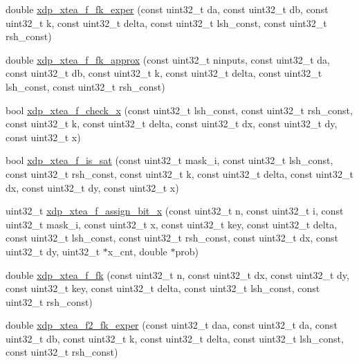 \begin{DoxyCompactItemize}
\item 
double \hyperlink{xdp-xtea-f-fk_8cc_a018d08ae7ff25abdcd37390243db1eb0}{xdp\-\_\-xtea\-\_\-f\-\_\-fk\-\_\-exper} (const uint32\-\_\-t da, const uint32\-\_\-t db, const uint32\-\_\-t k, const uint32\-\_\-t delta, const uint32\-\_\-t lsh\-\_\-const, const uint32\-\_\-t rsh\-\_\-const)
\item 
double \hyperlink{xdp-xtea-f-fk_8cc_ad0e35d7ca06473517c130c7b65a25b12}{xdp\-\_\-xtea\-\_\-f\-\_\-fk\-\_\-approx} (const uint32\-\_\-t ninputs, const uint32\-\_\-t da, const uint32\-\_\-t db, const uint32\-\_\-t k, const uint32\-\_\-t delta, const uint32\-\_\-t lsh\-\_\-const, const uint32\-\_\-t rsh\-\_\-const)
\item 
bool \hyperlink{xdp-xtea-f-fk_8cc_a6e69cef9b0ca14ea6b1f9b04b4881d1d}{xdp\-\_\-xtea\-\_\-f\-\_\-check\-\_\-x} (const uint32\-\_\-t lsh\-\_\-const, const uint32\-\_\-t rsh\-\_\-const, const uint32\-\_\-t k, const uint32\-\_\-t delta, const uint32\-\_\-t dx, const uint32\-\_\-t dy, const uint32\-\_\-t x)
\item 
bool \hyperlink{xdp-xtea-f-fk_8cc_a905c7d81037abb43273874ee21fcb871}{xdp\-\_\-xtea\-\_\-f\-\_\-is\-\_\-sat} (const uint32\-\_\-t mask\-\_\-i, const uint32\-\_\-t lsh\-\_\-const, const uint32\-\_\-t rsh\-\_\-const, const uint32\-\_\-t k, const uint32\-\_\-t delta, const uint32\-\_\-t dx, const uint32\-\_\-t dy, const uint32\-\_\-t x)
\item 
uint32\-\_\-t \hyperlink{xdp-xtea-f-fk_8cc_ac13f0ebeaefa51e754dc2f30ff6739e3}{xdp\-\_\-xtea\-\_\-f\-\_\-assign\-\_\-bit\-\_\-x} (const uint32\-\_\-t n, const uint32\-\_\-t i, const uint32\-\_\-t mask\-\_\-i, const uint32\-\_\-t x, const uint32\-\_\-t key, const uint32\-\_\-t delta, const uint32\-\_\-t lsh\-\_\-const, const uint32\-\_\-t rsh\-\_\-const, const uint32\-\_\-t dx, const uint32\-\_\-t dy, uint32\-\_\-t $\ast$x\-\_\-cnt, double $\ast$prob)
\item 
double \hyperlink{xdp-xtea-f-fk_8cc_a7c1689f4a0dacf2da163606aca381980}{xdp\-\_\-xtea\-\_\-f\-\_\-fk} (const uint32\-\_\-t n, const uint32\-\_\-t dx, const uint32\-\_\-t dy, const uint32\-\_\-t key, const uint32\-\_\-t delta, const uint32\-\_\-t lsh\-\_\-const, const uint32\-\_\-t rsh\-\_\-const)
\item 
double \hyperlink{xdp-xtea-f-fk_8cc_ae3c35b55368977a2cdafb55b0498ac85}{xdp\-\_\-xtea\-\_\-f2\-\_\-fk\-\_\-exper} (const uint32\-\_\-t daa, const uint32\-\_\-t da, const uint32\-\_\-t db, const uint32\-\_\-t k, const uint32\-\_\-t delta, const uint32\-\_\-t lsh\-\_\-const, const uint32\-\_\-t rsh\-\_\-const)

\end{DoxyCompactItemize}
